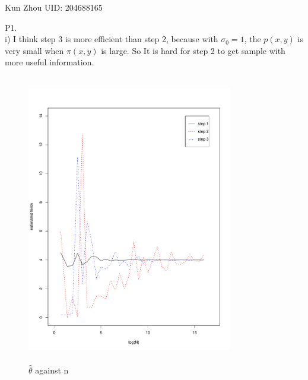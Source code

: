 \documentclass[11pt,english]{article}
\begin{document}
Kun Zhou \hfil UID: 204688165	
	
P1. \\
i) I think step 3 is more efficient than step 2, because with $\sigma_0=1$, the $p(x,y)$ is very small when $\pi(x,y)$ is large.  So It is hard for step 2 to get sample with more useful information.

\begin{figure}[H]
	\includegraphics[height=5in, width=0.8\textwidth]{p1_1.pdf}
	\caption{$\hat{\theta}$ against n} \label{p1_1}
\end{figure}
\end{document}
